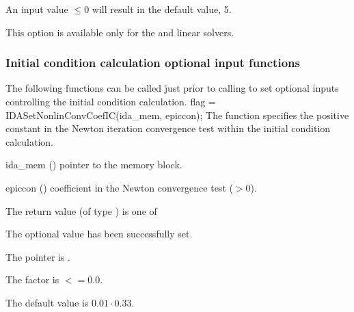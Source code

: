 {{  An input value  $\leq 0$ will result in the default value, 5.

  {\warn}This option is available only for the {\idaspbcg} and {\idasptfqmr} linear solvers.
}

\subsubsection{Initial condition calculation optional input functions}\label{sss:optin_iccalc}
The following functions can be called just prior to calling 
to set optional inputs controlling the initial condition calculation.
{
flag = IDASetNonlinConvCoefIC(ida\_mem, epiccon);
}
{
  The function  specifies the positive constant in
  the Newton iteration convergence test within the initial condition calculation.
}
{
  \begin{args}
  \item[ida\_mem] ()
    pointer to the {\ida} memory block.
  \item[epiccon] ()
    coefficient in the Newton convergence test ($>0$).
  \end{args}
}
{
  The return value  (of type ) is one of
  \begin{args}
  \item[\Id{IDA\_SUCCESS}] 
    The optional value has been successfully set.
  \item[\Id{IDA\_MEM\_NULL}]
    The  pointer is .
  \item[\Id{IDA\_ILL\_INPUT}]
    The  factor is $<= 0.0$.
  \end{args}
}
{
  The default value is $0.01 \cdot 0.33$.

}}
